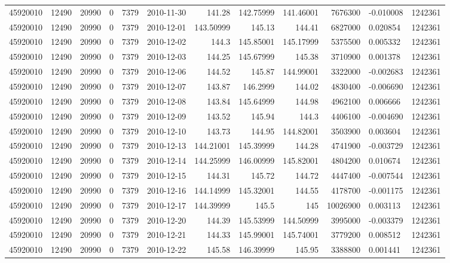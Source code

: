 \begin{tabular}{l | r | r | r | r | l | r | r | r | r | l | r}
45920010 & 12490 & 20990 & 0 & 7379 & 2010-11-30 & 141.28 & 142.75999 & 141.46001 & 7676300 & -0.010008 & 1242361 \\
45920010 & 12490 & 20990 & 0 & 7379 & 2010-12-01 & 143.50999 & 145.13 & 144.41 & 6827000 & 0.020854 & 1242361 \\
45920010 & 12490 & 20990 & 0 & 7379 & 2010-12-02 & 144.3 & 145.85001 & 145.17999 & 5375500 & 0.005332 & 1242361 \\
45920010 & 12490 & 20990 & 0 & 7379 & 2010-12-03 & 144.25 & 145.67999 & 145.38 & 3710900 & 0.001378 & 1242361 \\
45920010 & 12490 & 20990 & 0 & 7379 & 2010-12-06 & 144.52 & 145.87 & 144.99001 & 3322000 & -0.002683 & 1242361 \\
45920010 & 12490 & 20990 & 0 & 7379 & 2010-12-07 & 143.87 & 146.2999 & 144.02 & 4830400 & -0.006690 & 1242361 \\
45920010 & 12490 & 20990 & 0 & 7379 & 2010-12-08 & 143.84 & 145.64999 & 144.98 & 4962100 & 0.006666 & 1242361 \\
45920010 & 12490 & 20990 & 0 & 7379 & 2010-12-09 & 143.52 & 145.94 & 144.3 & 4406100 & -0.004690 & 1242361 \\
45920010 & 12490 & 20990 & 0 & 7379 & 2010-12-10 & 143.73 & 144.95 & 144.82001 & 3503900 & 0.003604 & 1242361 \\
45920010 & 12490 & 20990 & 0 & 7379 & 2010-12-13 & 144.21001 & 145.39999 & 144.28 & 4741900 & -0.003729 & 1242361 \\
45920010 & 12490 & 20990 & 0 & 7379 & 2010-12-14 & 144.25999 & 146.00999 & 145.82001 & 4804200 & 0.010674 & 1242361 \\
45920010 & 12490 & 20990 & 0 & 7379 & 2010-12-15 & 144.31 & 145.72 & 144.72 & 4447400 & -0.007544 & 1242361 \\
45920010 & 12490 & 20990 & 0 & 7379 & 2010-12-16 & 144.14999 & 145.32001 & 144.55 & 4178700 & -0.001175 & 1242361 \\
45920010 & 12490 & 20990 & 0 & 7379 & 2010-12-17 & 144.39999 & 145.5 & 145 & 10026900 & 0.003113 & 1242361 \\
45920010 & 12490 & 20990 & 0 & 7379 & 2010-12-20 & 144.39 & 145.53999 & 144.50999 & 3995000 & -0.003379 & 1242361 \\
45920010 & 12490 & 20990 & 0 & 7379 & 2010-12-21 & 144.33 & 145.99001 & 145.74001 & 3779200 & 0.008512 & 1242361 \\
45920010 & 12490 & 20990 & 0 & 7379 & 2010-12-22 & 145.58 & 146.39999 & 145.95 & 3388800 & 0.001441 & 1242361 \\

\end{tabular}
